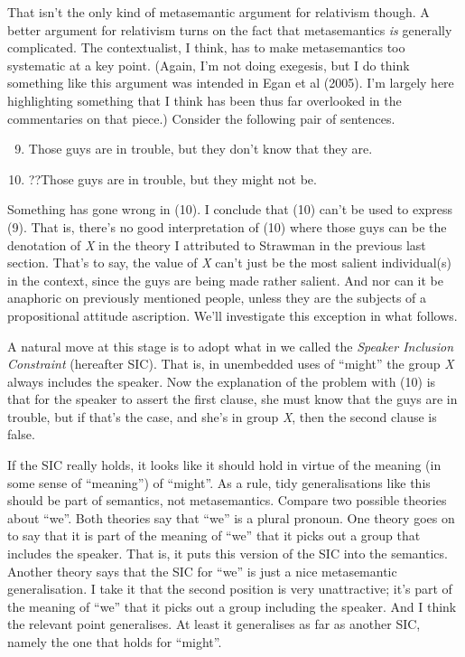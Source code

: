 That isn't the only kind of metasemantic argument for relativism though. A better argument for relativism turns on the fact that metasemantics \textit{is} generally complicated. The contextualist, I think, has to make metasemantics too systematic at a key point. (Again, I'm not doing exegesis, but I do think something like this argument was intended in Egan et al (2005). I'm largely here highlighting something that I think has been thus far overlooked in the commentaries on that piece.) Consider the following pair of sentences.

\renewcommand{\labelenumi}{(\arabic{enumi})}
\begin{enumerate}
\setcounter{enumi}{8}
\item Those guys are in {trouble}, but they don't know that they are.
\item ??Those guys are in {trouble}, but they might not be.
\end{enumerate}

\noindent Something has gone wrong in (10). I conclude that (10) can't be used to express (9). That is, there's no good interpretation of (10) where those guys can be the denotation of \textit{X} in the theory I attributed to Strawman in the previous last section. That's to say, the value of \textit{X} can't just be the most salient individual(s) in the context, since the guys are being made rather salient. And nor can it be anaphoric on previously mentioned people, unless they are the subjects of a propositional attitude ascription. We'll investigate this exception in what follows.

A natural move at this stage is to adopt what in \citet{Egan2005-EGAEMI} we called the \textit{Speaker Inclusion Constraint} (hereafter SIC). That is, in unembedded uses of ``might'' the group \textit{X} always includes the speaker. Now the explanation of the problem with (10) is that for the speaker to assert the first clause, she must know that the guys are in trouble, but if that's the case, and she's in group \textit{X}, then the second clause is false.

If the SIC really holds, it looks like it should hold in virtue of the meaning (in some sense of ``meaning'') of ``might''. As a rule, tidy generalisations like this should be part of semantics, not metasemantics. Compare two possible theories about ``we''. Both theories say that ``we'' is a plural pronoun. One theory goes on to say that it is part of the meaning of ``we'' that it picks out a group that includes the speaker. That is, it puts this version of the SIC into the semantics. Another theory says that the SIC for ``we'' is just a nice metasemantic generalisation. I take it that the second position is very unattractive; it's part of the meaning of ``we'' that it picks out a group including the speaker. And I think the relevant point generalises. At least it generalises as far as another SIC, namely the one that holds for ``might''.

